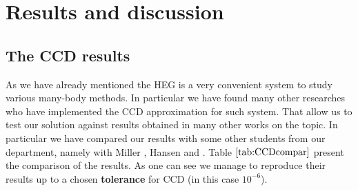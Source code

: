 \chapter{Results and discussion} \label{sec:Results}

\section{The CCD results}
As we have already mentioned the HEG is a very convenient system to study various many-body methods. In particular we have found many other researches who have implemented the CCD approximation for such system. That allow us to test our solution against results obtained in many other works on the topic. In particular we have compared our results with some other students from our department, namely with Miller \cite{millerAntumMechanicalStudies}, Hansen \cite{hansenCoupledClusterStudies} and \cite{gustavbaardsenCoupledclusterTheoryInfinite2014}. Table $\ref{tab:CCDcompar}$ present the comparison of the results. As one can see we manage to reproduce their results up to a chosen \textbf{tolerance} for CCD (in this case $10^{-6}$). 


